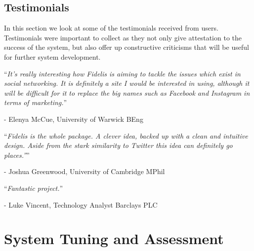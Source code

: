 \subsection{Testimonials}
In this section we look at some of the testimonials received from users. Testimonials were important to collect as they not only give attestation to the success of the system, but also offer up constructive criticisms that will be useful for further system development.

\begin{displayquote}
	\enquote{\textit{It's really interesting how Fidelis is aiming to tackle the issues which exist in social networking. It is definitely a site I would be interested in using, although it will be difficult for it to replace the big names such as Facebook and Instagram in terms of marketing.}}
	
	- Elenya McCue, University of Warwick BEng
\end{displayquote}

\begin{displayquote}
	\enquote{\textit{Fidelis is the whole package. A clever idea, backed up with a clean and intuitive design. Aside from the stark similarity to Twitter this idea can definitely go places.''}}
	
	- Joshua Greenwood, University of Cambridge MPhil
\end{displayquote}

\begin{displayquote}
	\enquote{\textit{Fantastic project.}}
	
	- Luke Vincent, Technology Analyst Barclays PLC
\end{displayquote}

\section{System Tuning and Assessment}